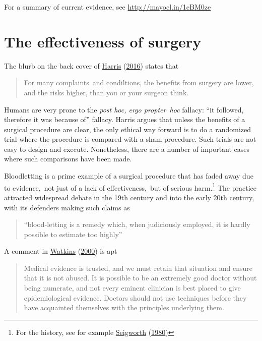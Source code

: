 \documentclass[
  10pt,
  b5paper]{book}
\begin{document}
For a summary of current evidence, see \url{http://mayocl.in/1cBM0ze}

\hypertarget{the-effectiveness-of-surgery}{%
\section{The effectiveness of surgery}\label{the-effectiveness-of-surgery}}

The blurb on the back cover of \protect\hyperlink{ref-harris2016book}{Harris} (\protect\hyperlink{ref-harris2016book}{2016}) states that

\begin{quote}
For many complaints~and condiltions, the benefits from surgery
are lower, and the risks higher, than you or your surgeon think.
\end{quote}

Humans are very prone to the \emph{post hoc, ergo propter~hoc} fallacy:
``it followed, therefore it was because of'' fallacy. Harris
argues that unless the benefits of a surgical procedure are clear,
the only ethical way forward is to do a randomized trial where
the procedure is compared with a sham procedure. Such trials
are not easy to design and execute. Nonetheless, there are a
number of important cases where such comparisons have been made.

Bloodletting is a prime example of a surgical procedure that
has faded away due to evidence,~not just of a lack of
effectiveness,~but of serious harm.\footnote{For the history, see for
  example \protect\hyperlink{ref-seigworth1980bloodletting}{Seigworth} (\protect\hyperlink{ref-seigworth1980bloodletting}{1980})} The practice attracted
widespread debate in the 19th century and into the early 20th
century, with its defenders making such claims as

\begin{quote}
``blood-letting is a remedy which, when judiciously employed,
it is hardly possible to estimate too highly''
\end{quote}

A comment in \protect\hyperlink{ref-watkins2000conviction}{Watkins} (\protect\hyperlink{ref-watkins2000conviction}{2000}) is apt

\begin{quote}
Medical evidence is trusted, and we must retain that situation and ensure that it is not abused. It is possible to be an extremely good doctor without being numerate, and not every eminent clinician is best placed to give epidemiological evidence. Doctors should not use techniques before they have acquainted themselves with the principles underlying them.
\end{quote}
\end{document}
